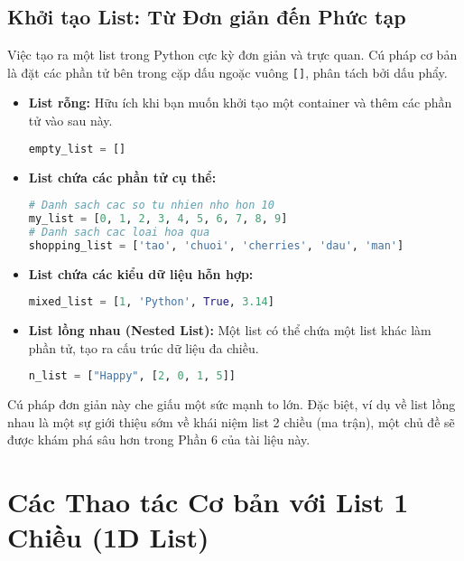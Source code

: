 \documentclass[11pt]{article}
\begin{document}
\subsection{Khởi tạo List: Từ Đơn giản đến Phức tạp}
Việc tạo ra một list trong Python cực kỳ đơn giản và trực quan. Cú pháp cơ bản là đặt các phần tử bên trong cặp dấu ngoặc vuông \texttt{[]}, phân tách bởi dấu phẩy.
\begin{itemize}
    \item \textbf{List rỗng:} Hữu ích khi bạn muốn khởi tạo một container và thêm các phần tử vào sau này.
    \begin{lstlisting}[language=Python]
empty_list = []
    \end{lstlisting}
    \item \textbf{List chứa các phần tử cụ thể:}
    \begin{lstlisting}[language=Python]
# Danh sach cac so tu nhien nho hon 10
my_list = [0, 1, 2, 3, 4, 5, 6, 7, 8, 9] 
# Danh sach cac loai hoa qua
shopping_list = ['tao', 'chuoi', 'cherries', 'dau', 'man']
    \end{lstlisting}
    \item \textbf{List chứa các kiểu dữ liệu hỗn hợp:}
    \begin{lstlisting}[language=Python]
mixed_list = [1, 'Python', True, 3.14]
    \end{lstlisting}
    \item \textbf{List lồng nhau (Nested List):} Một list có thể chứa một list khác làm phần tử, tạo ra cấu trúc dữ liệu đa chiều.
    \begin{lstlisting}[language=Python]
n_list = ["Happy", [2, 0, 1, 5]]
    \end{lstlisting}
\end{itemize}
Cú pháp đơn giản này che giấu một sức mạnh to lớn. Đặc biệt, ví dụ về list lồng nhau là một sự giới thiệu sớm về khái niệm list 2 chiều (ma trận), một chủ đề sẽ được khám phá sâu hơn trong Phần 6 của tài liệu này.

\section{Các Thao tác Cơ bản với List 1 Chiều (1D List)}
\end{document}
